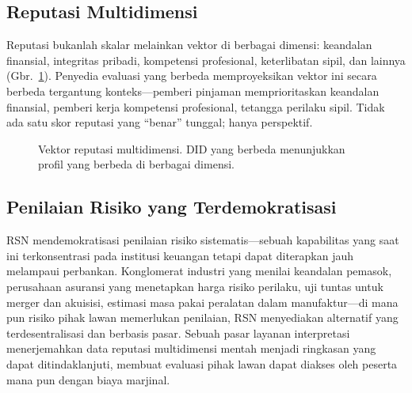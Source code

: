 \documentclass[11pt,a4paper,twocolumn]{article}
\begin{document}
\subsection{Reputasi Multidimensi}

Reputasi bukanlah skalar melainkan vektor di berbagai dimensi: keandalan finansial, integritas pribadi, kompetensi profesional, keterlibatan sipil, dan lainnya (Gbr.~\ref{fig:reputation-radar}). Penyedia evaluasi yang berbeda memproyeksikan vektor ini secara berbeda tergantung konteks---pemberi pinjaman memprioritaskan keandalan finansial, pemberi kerja kompetensi profesional, tetangga perilaku sipil. Tidak ada satu skor reputasi yang ``benar'' tunggal; hanya perspektif.

\begin{figure}[ht]
\centering
{}
\caption{Vektor reputasi multidimensi. DID yang berbeda menunjukkan profil yang berbeda di berbagai dimensi.}
\label{fig:reputation-radar}
\end{figure}

\subsection{Penilaian Risiko yang Terdemokratisasi}

RSN mendemokratisasi penilaian risiko sistematis---sebuah kapabilitas yang saat ini terkonsentrasi pada institusi keuangan tetapi dapat diterapkan jauh melampaui perbankan. Konglomerat industri yang menilai keandalan pemasok, perusahaan asuransi yang menetapkan harga risiko perilaku, uji tuntas untuk merger dan akuisisi, estimasi masa pakai peralatan dalam manufaktur---di mana pun risiko pihak lawan memerlukan penilaian, RSN menyediakan alternatif yang terdesentralisasi dan berbasis pasar. Sebuah pasar layanan interpretasi menerjemahkan data reputasi multidimensi mentah menjadi ringkasan yang dapat ditindaklanjuti, membuat evaluasi pihak lawan dapat diakses oleh peserta mana pun dengan biaya marjinal.
\end{document}
